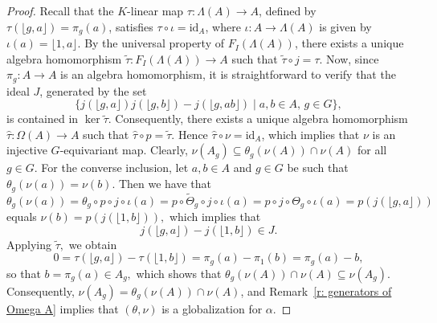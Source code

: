 \documentclass[11pt]{amsart}
\numberwithin{equation}{section}
\theoremstyle{definition}
\theoremstyle{remark}
\begin{document}
\begin{proof}
    Recall that the \(K\)-linear map \(\tau: \Lambda(A) \to A\), defined by \(\tau(\lfloor g, a \rfloor) = \pi_g(a)\), satisfies \(\tau \circ \iota = \mathrm{id}_A\), where \(\iota: A \to \Lambda(A)\) is given by \(\iota(a) = \lfloor 1, a \rfloor\). By the universal property of \(F_I(\Lambda(A))\), there exists a unique algebra homomorphism \(\widetilde{\tau}: F_I(\Lambda(A)) \to A\) such that \(\widetilde{\tau} \circ j = \tau\). Now, since \(\pi_g: A \to A\) is an algebra homomorphism, it is straightforward to verify that the ideal \(J\), generated by the set 
    \[
        \{j(\lfloor g, a \rfloor)j(\lfloor g, b \rfloor) - j(\lfloor g, ab \rfloor) \mid a, b \in A, \, g \in G\},
    \]
    is contained in \(\ker \widetilde{\tau}\). Consequently, there exists a unique algebra homomorphism \(\widehat{\tau}: \Omega(A) \to A\) such that \(\widehat{\tau} \circ p = \widetilde{\tau}\). Hence \(\widehat{\tau} \circ \nu = \mathrm{id}_A\), which implies that \(\nu\) is an injective \(G\)-equivariant map.
     Clearly,  \(\nu(A_g)\subseteq \theta_g(\nu(A)) \cap \nu(A)\) for all $g\in G$.
    For the converse inclusion, let \(a,b \in A\) and \(g \in G\) be such that \(\theta_g(\nu(a))=\nu(b)\).
    Then we have that 
    \[
        \theta_g(\nu(a))
        = \theta_g \circ p \circ  j \circ \iota (a)
        = p \circ \widetilde{\Theta}_g \circ j\circ \iota (a)
        =  p \circ  j\circ \Theta _g \circ \iota (a)
        = p (  j (\lfloor g, a \rfloor )) 
    \]
    equals
    \(\nu (b) = p (  j ( \lfloor 1, b \rfloor )),\) 
    which implies that 
    \[
      j (\lfloor g, a \rfloor ) -  j ( \lfloor 1, b \rfloor ) \in J.
    \]
    Applying $\widetilde{\tau},$ we obtain 
    \[
      0=\tau (\lfloor g, a \rfloor )   -   \tau ( \lfloor 1, b \rfloor ) = \pi _g (a) - \pi _1 (b) =  \pi _g (a) - b,
    \]
    so that  $b = \pi _g (a) \in  A_g,$ which shows that  \( \theta_g(\nu(A)) \cap \nu(A) \subseteq \nu(A_g). \)  Consequently,
   \(\nu(A_g) = \theta_g(\nu(A)) \cap \nu(A)\), and Remark~\ref{r: generators of Omega A} implies that $(\theta,\nu)$ is a globalization for $\alpha$.
\end{proof}
\end{document}

